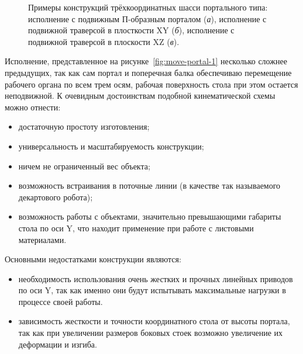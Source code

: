 \begin{figure}[ht]
	\caption[Примеры конструкций трёхкоординатных шасси портального типа]%
	{Примеры конструкций трёхкоординатных шасси портального типа: исполнение с подвижным П-образным порталом (\textit{а}), исполнение с подвижной траверсой в плосткости XY  (\textit{б}), исполнение с подвижной траверсой в плоскости XZ (\textit{в}).}\label{fig:move-portal}
\end{figure}

Исполнение, представленное на рисунке~\cref{fig:move-portal-1} несколько сложнее предыдущих, так как сам портал и поперечная балка обеспечиваю перемещение рабочего органа по всем трем осям, рабочая поверхность стола при этом остается неподвижной. К очевидным достоинствам подобной кинематической схемы можно отнести:

\begin{itemize}
	\item достаточную простоту изготовления;
	\item универсальность и масштабируемость конструкции;
	\item ничем не ограниченный вес объекта;
	\item возможность встраивания в поточные линии (в качестве так называемого декартового робота);
	\item возможность работы с объектами, значительно превышающими габариты стола по оси Y, что находит применение при работе с листовыми материалами.
\end{itemize}

Основными недостатками конструкции являются:

\begin{itemize}
	\item необходимость использования очень жестких и прочных линейных приводов по оси Y, так как именно они будут испытывать максимальные нагрузки в процессе своей работы.
	\item зависимость жесткости и точности координатного стола от высоты портала, так как при увеличении размеров боковых стоек возможно увеличение их деформации и изгиба.
\end{itemize}

